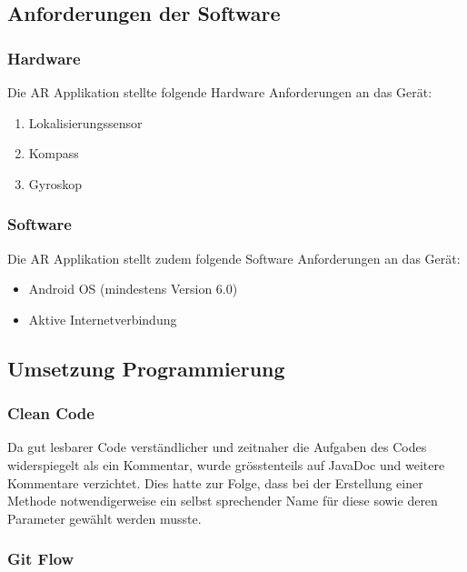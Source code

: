 \documentclass[a4paper]{scrreprt}
\begin{document}
\subsection{Anforderungen der Software}

\subsubsection{Hardware}

Die AR Applikation stellte folgende Hardware Anforderungen an das Gerät:

\begin{enumerate}
	\item Lokalisierungssensor
	\item Kompass
	\item Gyroskop
\end{enumerate}

\subsubsection{Software}

Die AR Applikation stellt zudem folgende Software Anforderungen an das Gerät:

\begin{itemize}
	\item Android OS (mindestens Version 6.0)
	\item Aktive Internetverbindung
\end{itemize}

\subsection{Umsetzung Programmierung}

\subsubsection{Clean Code}

Da gut lesbarer Code verständlicher und zeitnaher die Aufgaben des Codes widerspiegelt als ein Kommentar, wurde grösstenteils auf JavaDoc und weitere Kommentare verzichtet. Dies hatte zur Folge, dass bei der Erstellung einer Methode notwendigerweise ein selbst sprechender Name für diese sowie deren Parameter gewählt werden musste.

\subsubsection{Git Flow}
\end{document}
